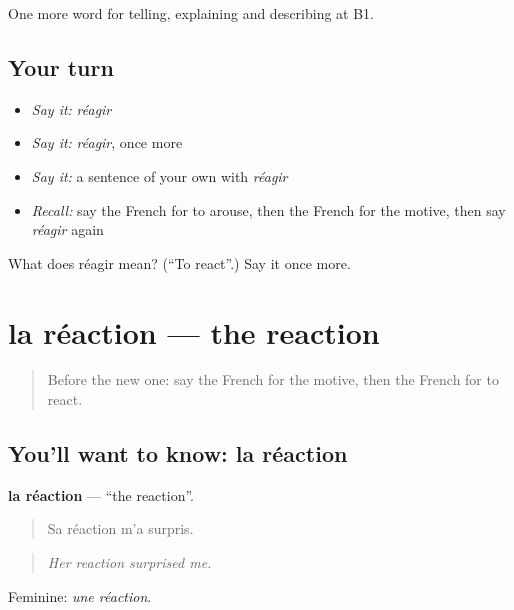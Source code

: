 \begin{grammarlens}[title={What you've built}]
One more word for telling, explaining and describing at B1.
\end{grammarlens}

\subsection*{Your turn}
\begin{itemize}
\raggedright
  \item \emph{Say it:} \emph{réagir}
  \item \emph{Say it:} \emph{réagir}, once more
  \item \emph{Say it:} a sentence of your own with \emph{réagir}
  \item \emph{Recall:} say the French for to arouse, then the French for the motive, then say \emph{réagir} again
\end{itemize}

\begin{tcolorbox}[breakable,colback=teal!4,colframe=teal!35!black,title={Before you move on}]
What does réagir mean? (\textquotedblleft{}To react\textquotedblright{}.) Say it once more.
\end{tcolorbox}
\section[la réaction]{la réaction — the reaction}

\label{lesson:FR-C351-reaction}



\begin{quote}
Before the new one: say the French for the motive, then the French for to react.
\end{quote}

\subsection*{You'll want to know: la réaction}
\textbf{la réaction} — \textquotedblleft{}the reaction\textquotedblright{}.

\begin{quote}
Sa réaction m'a surpris.
\end{quote}

\begin{quote}
\emph{Her reaction surprised me.}
\end{quote}

Feminine: \emph{une réaction}.

